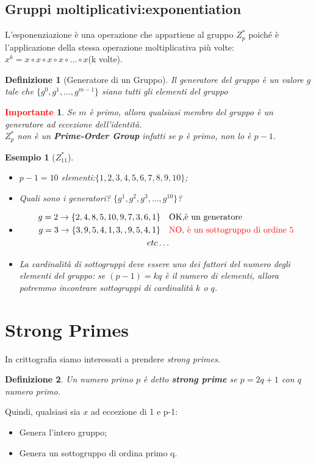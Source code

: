 \documentclass{book}
\newtheorem{Definizione}{\textbf{Definizione}}
\newtheorem*{Importante}{\textbf{\textcolor{red}{Importante}}}
\newtheorem{esempio}{\textcolor{Grey1}{Esempio}}
\begin{document}
\subsection{Gruppi moltiplicativi:exponentiation}
L'esponenziazione è una operazione che appartiene al gruppo \(Z_{p}^{*}\) poiché è l'applicazione della stessa operazione moltiplicativa più volte:\(x^{k}=x\circ x\circ x\circ x\circ \ldots \circ x\)(k volte).
\begin{Definizione}[Generatore di un Gruppo]
	Il generatore del gruppo è un valore \(g\) tale che \( \{g^{0},g^{1},\ldots ,g^{m-1} \} \) siano tutti gli elementi del gruppo
\end{Definizione}
\begin{Importante}
	Se \(m\) è primo, allora qualsiasi membro del gruppo è un generatore ad eccezione dell'identità\@.\\
	\(Z_{p}^{*}\) non è un \textbf{Prime-Order Group} infatti se \(p\) è primo, non lo è \(p-1\).
\end{Importante}
\newpage
\begin{esempio}[\(Z_{11}^{*}\)]
	\begin{itemize}
		\item \(p-1=10\) elementi:\( \{1,2,3,4,5,6,7,8,9,10 \} \);
		\item Quali sono i generatori? \( \{g^{1},g^{2},g^{3},\ldots ,g^{10}\} \)?
		\item \begin{align*}
			      g=2\rightarrow \{2,4,8,5,10,9,7,3,6,1\}\quad & \text{OK,è un generatore}                                \\
			      g=3\rightarrow \{3,9,5,4,1,3,,9,5,4,1\}\quad & \text{\textcolor{red}{NO, è un sottogruppo di ordine 5}} \\
			      etc\ldots
		      \end{align*}
		\item La cardinalità di sottogruppi deve essere uno dei fattori del numero degli elementi del gruppo: se \((p-1)=kq\) è il numero di elementi, allora potremmo incontrare sottogruppi di cardinalità \(k\) o \(q\).
	\end{itemize}
\end{esempio}
\section{Strong Primes}
In crittografia siamo interessati a prendere \emph{strong primes}.
\begin{Definizione}
	Un numero primo \(p\) è detto \textbf{strong prime} se \(p=2q+1\) con \(q\) numero primo.
\end{Definizione}
Quindi, qualsiasi sia \(x\) ad eccezione di 1 e p-1:\begin{itemize}
	\item Genera l'intero gruppo;
	\item Genera un sottogruppo di ordina primo q.
\end{itemize}
\end{document}
